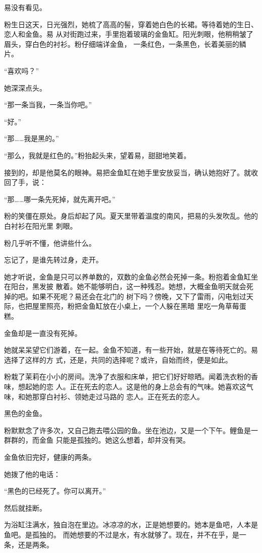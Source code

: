 		易没有看见。

		粉生日这天，日光强烈，她梳了高高的髻，穿着她白色的长裙。等待着她的生日、恋人和金鱼。易
	从对街跑过来，手里抱着玻璃的金鱼缸。阳光刺眼，他稍稍皱了眉头，穿白色的衬衫。粉仔细端详金鱼，
	一条红色，一条黑色，长着美丽的鳞片。

		“喜欢吗？”

		她深深点头。

		“那一条当我，一条当你吧。”

		“好。”

		“那……我是黑的。”

		“那么，我就是红色的。”粉抬起头来，望着易，甜甜地笑着。

		接到的，却是他莫名的眼神。易把金鱼缸在她手里安放妥当，确认她抱好了。就收回了手，说：

		“那……哪一条先死掉，就先离开吧。”

		粉的笑僵在原处。身后却起了风。夏天里带着温度的南风，把易的头发吹乱。他的白衬衫在阳光里
	刺眼。

		粉几乎听不懂，他讲些什么。

		忘记了，是谁先转过身，走开。

		她才听说，金鱼是只可以养单数的，双数的金鱼必然会死掉一条。粉抱着金鱼缸坐在阳台，黑发披
	散着。她不能够明白，这一种残忍。她想，大概金鱼明天就会死掉的吧。如果不死呢？易还会在北门的
	树下吗？傍晚，又下了雷雨，闪电划过天际，也把屋里照亮，粉把金鱼缸放在小桌上，一个人躲在黑暗
	里吃一角草莓蛋糕。

		金鱼却是一直没有死掉。

		她就呆呆望它们游着，在一起。金鱼不知道，有一些开始，就是在等待死亡的。易选择了这样的方
	式，还是，共同的选择呢？或许，自始而终，便是如此。

		粉栽了茉莉在小小的房间。洗净了衣服和床单，把它们好好晾晒。闻着洗衣粉的香味，想起她的恋
	人。正在死去的恋人。这是他的身上总会有的气味。她喜欢这气味，和她那穿白衬衫、领她走过马路的
	恋人。正在死去的恋人。

		黑色的金鱼。

		粉默默念了许多次，又自己跑去喂公园的鱼。坐在池边，又是一个下午。鲤鱼是一群群的，而金鱼
	只能是孤独的。她这么想着，却并没有哭。

		金鱼依旧完好，健康的两条。

		她拨了他的电话：

		“黑色的已经死了。你可以离开。”

		然后就挂断。

		为浴缸注满水，独自泡在里边。冰凉凉的水，正是她想要的。她本是鱼吧，人本是鱼吧。是孤独的。
	而她想要的不过是水，有水就够了。现在，并不在乎，是一条，还是两条。

